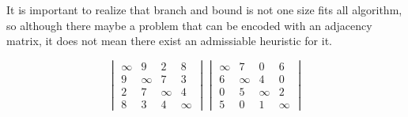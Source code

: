    It is important to realize that branch and bound is not one size fits all algorithm, so
    although there maybe a problem that can be encoded with an adjacency matrix, it does not mean
    there exist an admissiable heuristic for it. 

   \begin{equation}
	    \begin{vmatrix}
	        \infty & 9 & 2 & 8\\
	        9 & \infty & 7 & 3 \\
	        2 & 7 & \infty & 4 \\
	        8 & 3 & 4 & \infty
	    \end{vmatrix}
	    \begin{vmatrix}
	        \infty & 7 & 0 & 6\\
	        6 & \infty & 4 & 0 \\
	        0 & 5 & \infty & 2 \\
	        5 & 0 & 1 & \infty
	    \end{vmatrix}
	\end{equation}
